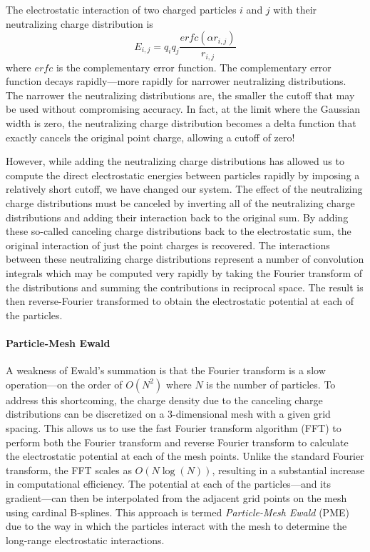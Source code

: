 The electrostatic interaction of two charged particles $i$ and $j$ with their
neutralizing charge distribution is 
\begin{equation*}
   E_{i,j} = q_i q_j \frac {erfc(\alpha r_{i,j})} {r_{i,j}}
\end{equation*}
where $erfc$ is the complementary error function. The complementary error
function decays rapidly---more rapidly for narrower neutralizing distributions.
The narrower the neutralizing distributions are, the smaller the cutoff that may
be used without compromising accuracy. In fact, at the limit where the Gaussian
width is zero, the neutralizing charge distribution becomes a delta function
that exactly cancels the original point charge, allowing a cutoff of zero!

However, while adding the neutralizing charge distributions has allowed us to
compute the direct electrostatic energies between particles rapidly by imposing
a relatively short cutoff, we have changed our system. The effect of the
neutralizing charge distributions must be canceled by inverting all of the
neutralizing charge distributions and adding their interaction back to the
original sum. By adding these so-called canceling charge distributions back to
the electrostatic sum, the original interaction of just the point charges is
recovered. The interactions between these neutralizing charge distributions
represent a number of convolution integrals which may be computed very rapidly
by taking the Fourier transform of the distributions and summing the
contributions in reciprocal space. The result is then reverse-Fourier
transformed to obtain the electrostatic potential at each of the particles.
\cite{Allen_Tildesley}

\paragraph{Particle-Mesh Ewald}

A weakness of Ewald's summation is that the Fourier transform is a slow
operation---on the order of $O(N^2)$ where $N$ is the number of particles. To
address this shortcoming, the charge density due to the canceling charge
distributions can be discretized on a 3-dimensional mesh with a given grid
spacing. This allows us to use the fast Fourier transform algorithm (FFT) to
perform both the Fourier transform and reverse Fourier transform to calculate
the electrostatic potential at each of the mesh points. Unlike the standard
Fourier transform, the FFT scales as $O(N\log(N))$, resulting in a substantial
increase in computational efficiency. The potential at each of the
particles---and its gradient---can then be interpolated from the adjacent grid
points on the mesh using cardinal B-splines. \cite{Darden_Structure_1999_v7_p55}
This approach is termed \emph{Particle-Mesh Ewald} (PME) due to the way in which
the particles interact with the mesh to determine the long-range electrostatic
interactions.

